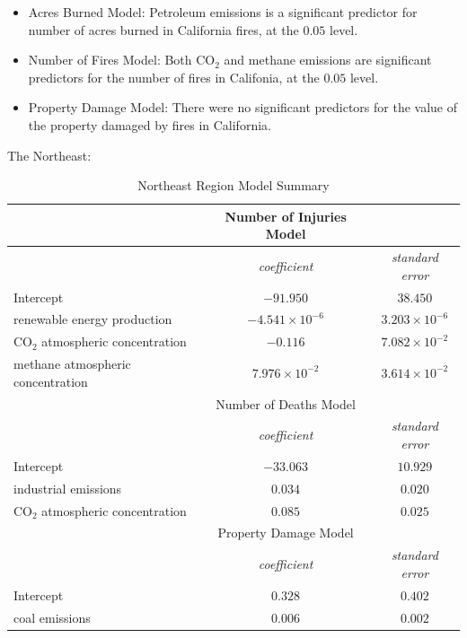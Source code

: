 \documentclass[10pt,]{article}
\begin{document}
\begin{itemize}
  \item Acres Burned Model: Petroleum emissions is a significant predictor for number of acres burned in California fires, at the $0.05$ level.
  \item Number of Fires Model: Both CO$_2$ and methane emissions are significant predictors for the number of fires in Califonia, at the $0.05$ level.
  \item Property Damage Model: There were no significant predictors for the value of the property damaged by fires in California.
\end{itemize}

\newpage

The Northeast:

\begin{center}
  \begin{table}[H]
  \caption{\label{tab:table- name}Northeast Region Model Summary}
  \smallskip
  \begin{center}
  \begin{tabular}{|l c c|}
  \hline
   & Number of Injuries Model & \\
  \hline\hline
   & \textit{coefficient} & \textit{standard error} \\ [0.5ex] 
  \hline
  Intercept & $-91.950$ & $38.450$ \\ 
  \hline
  renewable energy production & $-4.541 \times 10^{-6}$ & $3.203 \times 10^{-6}$ \\
  \hline
  CO$_2$ atmospheric concentration & $-0.116$ & $7.082 \times 10^{-2}$ \\
  \hline
  methane atmospheric concentration & $7.976 \times 10^{-2}$ & $3.614 \times 10^{-2}$ \\
  \hline\hline
   & Number of Deaths Model & \\
  \hline\hline
   & \textit{coefficient} & \textit{standard error} \\ [0.5ex] 
  \hline
  Intercept & $-33.063$ & $10.929$ \\ 
  \hline
  industrial emissions & $0.034$ & $0.020$ \\
  \hline
  CO$_2$ atmospheric concentration & $0.085$ & $0.025$ \\
  \hline\hline
   & Property Damage Model & \\
  \hline\hline
   & \textit{coefficient} & \textit{standard error} \\ [0.5ex] 
  \hline
  Intercept & $0.328$ & $0.402$ \\ 
  \hline
  coal emissions & $0.006$ & $0.002$ \\
  \hline
  \end{tabular}
  \end{center}
  \end{table}
\end{center}
\end{document}
